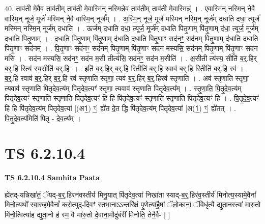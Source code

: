 \documentclass[17pt]{extarticle}
\begin{document}
40. ताव॑ती मे॒वैव ताव॑ती॒म् ताव॑ती मे॒वास्मि॑न् नस्मिन्ने॒व ताव॑ती॒म् ताव॑ती मे॒वास्मिन्न्॑ । . ए॒वास्मि॑न् नस्मिन् ने॒वै वास्मि॒न् नूर्ज॒ मूर्ज॑ मस्मिन् ने॒वै वास्मि॒न् नूर्ज᳚म् । . अ॒स्मि॒न् नूर्ज॒ मूर्ज॑ मस्मिन् नस्मि॒न् नूर्ज॑म् दधाति दधा॒ त्यूर्ज॑ मस्मिन् नस्मि॒न् नूर्ज॑म् दधाति । . ऊर्ज॑म् दधाति दधा॒ त्यूर्ज॒ मूर्ज॑म् दधाति पितृ॒णाम् पि॑तृ॒णाम् द॑धा॒ त्यूर्ज॒ मूर्ज॑म् दधाति पितृ॒णाम् । . द॒धा॒ति॒ पि॒तृ॒णाम् पि॑तृ॒णाम् द॑धाति दधाति पितृ॒णाꣳ सद॑नꣳ॒॒ सद॑नम् पितृ॒णाम् द॑धाति दधाति पितृ॒णाꣳ सद॑नम् । . पि॒तृ॒णाꣳ सद॑नꣳ॒॒ सद॑नम् पितृ॒णाम् पि॑तृ॒णाꣳ सद॑न मस्यसि॒ सद॑नम् पितृ॒णाम् पि॑तृ॒णाꣳ सद॑न मसि । . सद॑न मस्यसि॒ सद॑नꣳ॒॒ सद॑न म॒सी तीत्य॑सि॒ सद॑नꣳ॒॒ सद॑न म॒सीति॑ । . अ॒सीती त्य॑स्य॒ सीति॑ ब॒र्॒.हिर् ब॒र्॒.हि रित्य॑ स्य॒सीति॑ ब॒र्॒.हिः । . इति॑ ब॒र्॒.हिर् ब॒र्॒.हि रितीति॑ ब॒र्॒.हि रवाव॑ ब॒र्॒.हि रितीति॑ ब॒र्॒.हि रव॑ । . ब॒र्॒.हि रवाव॑ ब॒र्॒.हिर् ब॒र्॒.हि रव॑ स्तृणाति स्तृणा॒ त्यव॑ ब॒र्॒.हिर् ब॒र्॒.हिरव॑ स्तृणाति । . अव॑ स्तृणाति स्तृणा॒ त्यवाव॑ स्तृणाति पितृदेव॒त्य॑म् पितृदेव॒त्यꣳ॑ स्तृणा॒ त्यवाव॑ स्तृणाति पितृदेव॒त्य᳚म् । . स्तृ॒णा॒ति॒ पि॒तृ॒दे॒व॒त्य॑म् पितृदेव॒त्यꣳ॑ स्तृणाति स्तृणाति पितृदेव॒त्यꣳ॑ हि हि पि॑तृदेव॒त्यꣳ॑ स्तृणाति स्तृणाति पितृदेव॒त्यꣳ॑ हि । . पि॒तृ॒दे॒व॒त्यꣳ॑ हि हि पि॑तृदेव॒त्य॑म् पितृदेव॒त्या᳚ [(अ1॒) ꣳ॒] ह्ये॑त दे॒त द्धि पि॑तृदेव॒त्य॑म् 
पितृदेव॒त्या᳚ [अ(1॒) ꣳ॒] ह्ये॑तत् । . पि॒तृ॒दे॒व॒त्य॑मिति॑ पितृ - दे॒व॒त्य᳚म् । \newline
\pagebreak
{}

\section{ TS 6.2.10.4 }

\textbf{TS 6.2.10.4 } \newline
\textbf{Samhita Paata} \newline

ह्ये॑तद्-यन्निखा॑तं॒ ॅयद्-ब॒र्॒.हिरन॑वस्तीर्य मिनु॒यात् पि॑तृदेव॒त्या॑ निखा॑ता स्याद्-ब॒र्॒.हिर॑व॒स्तीर्य॑ मिनोत्य॒स्यामे॒वैनां᳚ मिनो॒त्यथो᳚ स्वा॒रुह॑मे॒वैनां᳚ करो॒त्युद्-दिवꣳ॑ स्तभा॒नाऽऽन्तरि॑क्षं पृ॒णेत्या॑है॒षां ॅलो॒कानां॒ ॅविधृ॑त्यै द्युता॒नस्त्वा॑ मारु॒तो मि॑नो॒त्वित्या॑ह द्युता॒नो ह॑ स्म॒ वै मा॑रु॒तो दे॒वाना॒मौदु॑बंरीं मिनोति॒ तेनै॒वै- [  ] \newline
\end{document}
